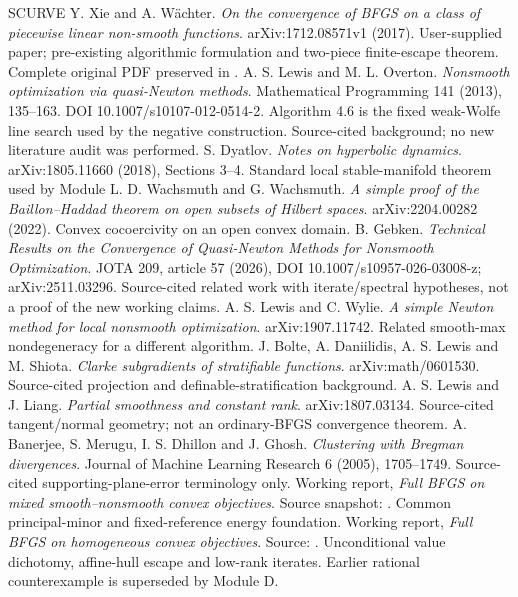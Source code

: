\begin{thebibliography}{SCURVE}
 Y. Xie and A. W\"achter. \emph{On the convergence of BFGS on a class of piecewise linear non-smooth functions}. arXiv:1712.08571v1 (2017). User-supplied paper; pre-existing algorithmic formulation and two-piece finite-escape theorem. Complete original PDF preserved in .
 A. S. Lewis and M. L. Overton. \emph{Nonsmooth optimization via quasi-Newton methods}. Mathematical Programming 141 (2013), 135--163. DOI 10.1007/s10107-012-0514-2. Algorithm 4.6 is the fixed weak-Wolfe line search used by the negative construction. Source-cited background; no new literature audit was performed.
 S. Dyatlov. \emph{Notes on hyperbolic dynamics}. arXiv:1805.11660 (2018), Sections 3--4. Standard local stable-manifold theorem used by Module L.
 D. Wachsmuth and G. Wachsmuth. \emph{A simple proof of the Baillon--Haddad theorem on open subsets of Hilbert spaces}. arXiv:2204.00282 (2022). Convex cocoercivity on an open convex domain.
 B. Gebken. \emph{Technical Results on the Convergence of Quasi-Newton Methods for Nonsmooth Optimization}. JOTA 209, article 57 (2026), DOI 10.1007/s10957-026-03008-z; arXiv:2511.03296. Source-cited related work with iterate/spectral hypotheses, not a proof of the new working claims.
 A. S. Lewis and C. Wylie. \emph{A simple Newton method for local nonsmooth optimization}. arXiv:1907.11742. Related smooth-max nondegeneracy for a different algorithm.
 J. Bolte, A. Daniilidis, A. S. Lewis and M. Shiota. \emph{Clarke subgradients of stratifiable functions}. arXiv:math/0601530. Source-cited projection and definable-stratification background.
 A. S. Lewis and J. Liang. \emph{Partial smoothness and constant rank}. arXiv:1807.03134. Source-cited tangent/normal geometry; not an ordinary-BFGS convergence theorem.
 A. Banerjee, S. Merugu, I. S. Dhillon and J. Ghosh. \emph{Clustering with Bregman divergences}. Journal of Machine Learning Research 6 (2005), 1705--1749. Source-cited supporting-plane-error terminology only.
 Working report, \emph{Full BFGS on mixed smooth--nonsmooth convex objectives}. Source snapshot: . Common principal-minor and fixed-reference energy foundation.
 Working report, \emph{Full BFGS on homogeneous convex objectives}. Source: . Unconditional value dichotomy, affine-hull escape and low-rank iterates. Earlier rational counterexample is superseded by Module D.

\end{thebibliography}
